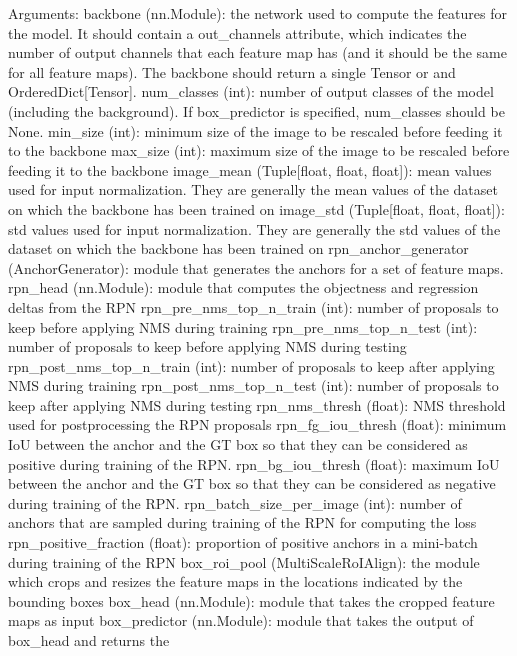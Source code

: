 \begin{DoxyVerb}
Arguments:
    backbone (nn.Module): the network used to compute the features for the model.
        It should contain a out_channels attribute, which indicates the number of output
        channels that each feature map has (and it should be the same for all feature maps).
        The backbone should return a single Tensor or and OrderedDict[Tensor].
    num_classes (int): number of output classes of the model (including the background).
        If box_predictor is specified, num_classes should be None.
    min_size (int): minimum size of the image to be rescaled before feeding it to the backbone
    max_size (int): maximum size of the image to be rescaled before feeding it to the backbone
    image_mean (Tuple[float, float, float]): mean values used for input normalization.
        They are generally the mean values of the dataset on which the backbone has been trained
        on
    image_std (Tuple[float, float, float]): std values used for input normalization.
        They are generally the std values of the dataset on which the backbone has been trained on
    rpn_anchor_generator (AnchorGenerator): module that generates the anchors for a set of feature
        maps.
    rpn_head (nn.Module): module that computes the objectness and regression deltas from the RPN
    rpn_pre_nms_top_n_train (int): number of proposals to keep before applying NMS during training
    rpn_pre_nms_top_n_test (int): number of proposals to keep before applying NMS during testing
    rpn_post_nms_top_n_train (int): number of proposals to keep after applying NMS during training
    rpn_post_nms_top_n_test (int): number of proposals to keep after applying NMS during testing
    rpn_nms_thresh (float): NMS threshold used for postprocessing the RPN proposals
    rpn_fg_iou_thresh (float): minimum IoU between the anchor and the GT box so that they can be
        considered as positive during training of the RPN.
    rpn_bg_iou_thresh (float): maximum IoU between the anchor and the GT box so that they can be
        considered as negative during training of the RPN.
    rpn_batch_size_per_image (int): number of anchors that are sampled during training of the RPN
        for computing the loss
    rpn_positive_fraction (float): proportion of positive anchors in a mini-batch during training
        of the RPN
    box_roi_pool (MultiScaleRoIAlign): the module which crops and resizes the feature maps in
        the locations indicated by the bounding boxes
    box_head (nn.Module): module that takes the cropped feature maps as input
    box_predictor (nn.Module): module that takes the output of box_head and returns the

\end{DoxyVerb}
